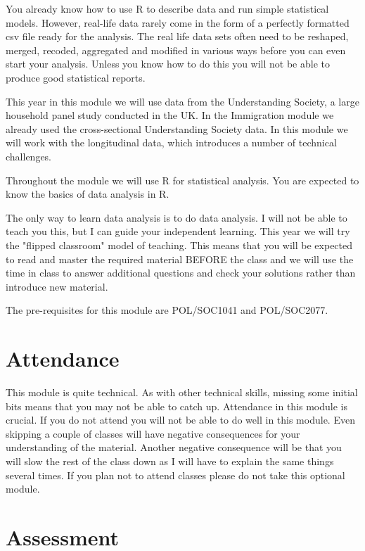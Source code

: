 \documentclass[indentfirst]{article}
\begin{document}
You already know how to use R to describe data and run simple statistical models. However, real-life data rarely come in the form of a perfectly formatted csv file ready for the analysis. The real life data sets often need to be reshaped, merged, recoded, aggregated and modified in various ways before you can even start your analysis. Unless you know how to do this you will not be able to produce good statistical reports.

This year in this module we will use data from the Understanding Society, a large household panel study conducted in the UK. In the Immigration module we already used the cross-sectional Understanding Society data. In this module we will work with the longitudinal data, which introduces a number of technical challenges.

Throughout the module we will use R for statistical analysis. You are expected to know the basics of data analysis in R.

The only way to learn data analysis is to do data analysis. I will not be able to teach you this, but I can guide your independent learning. This year we will try the "flipped classroom" model of teaching. This means that you will be expected to read and master the required material BEFORE the class and we will use the time in class to answer additional questions and check your solutions rather than introduce new material.

The pre-requisites for this module are POL/SOC1041 and POL/SOC2077.

\section{Attendance}

This module is quite technical. As with other technical skills, missing some initial bits means that you may not be able to catch up. Attendance in this module is crucial. If you do not attend you will not be able to do well in this module. Even skipping a couple of classes will have negative consequences for your understanding of the material. Another negative consequence will be that you will slow the rest of the class down as I will have to explain the same things several times. If you plan not to attend classes please do not take this optional module.

\section{Assessment}
\end{document}
